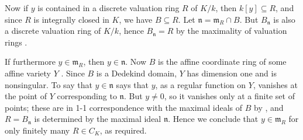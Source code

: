 {Now if $y$ is contained in a discrete valuation ring $R$ of $K/k$, then $k[y]\subseteq R$, and since $R$ is integrally closed in $K$, we have $B\subseteq R$. \hypertarget{err-I-6-5}{}Let $\mathfrak n=\mathfrak m_R\cap B$.  But $B_{\mathfrak n}$ is also a discrete valuation ring of $K/k$, hence $B_{\mathfrak n}=R$ by the maximality of valuation rings .

If furthermore $y\in\mathfrak m_R$, then $y\in\mathfrak n$. Now $B$ is the affine coordinate ring of some affine variety $Y$ . Since $B$ is a Dedekind domain, $Y$ has dimension one and is nonsingular. To say that $y\in\mathfrak n$ says that $y$, as a regular function on $Y$, vanishes at the point of $Y$ corresponding to $\mathfrak n$. But $y\ne0$, so it vanishes only at a finite set of points; these are in 1-1 correspondence with the maximal ideals of $B$ by , and $R=B_{\mathfrak n}$ is determined by the maximal ideal $\mathfrak n$. Hence we conclude that $y\in\mathfrak m_R$ for only finitely many $R\in C_K$, as required.}
